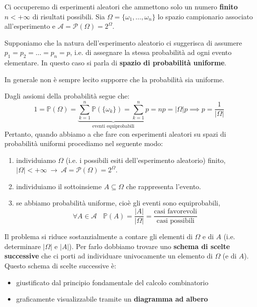 
\ParteEsercizi

Ci occuperemo di esperimenti aleatori che ammettono solo un numero \textbf{finito} $n< +\infty $ di risultati possibili. Sia $\Omega =\{\omega _{1} ,\dotsc ,\omega _{n}\}$ lo spazio campionario associato all'esperimento e $\mathcal{A} =\mathcal{P}( \Omega ) =2^{\Omega }$.

Supponiamo che la natura dell'esperimento aleatorio ci suggerisca di assumere $p_{1} =p_{2} =\dotsc =p_{n} =p$, i.e. di assegnare la stessa probabilità ad ogni evento elementare. In questo caso si parla di \textbf{spazio di probabilità uniforme}.
\begin{oss}
In generale non è sempre lecito supporre che la probabilità sia uniforme.
\end{oss}
Dagli assiomi della probabilità segue che:
\begin{equation*}
1=\mathbb{P}( \Omega ) =\underbrace{\sum\limits _{k=1}^{n}\mathbb{P}(\{\omega _{k}\}) =\sum\limits _{k=1}^{n} p}_{\text{eventi equiprobabili}} =np=| \Omega | p\implies \boxed{p=\frac{1}{| \Omega | }}
\end{equation*}
Pertanto, quando abbiamo a che fare con esperimenti aleatori su spazi di probabilità uniformi procediamo nel seguente modo:
\begin{enumerate}
\item individuiamo $\Omega $ (i.e. i possibili esiti dell'esperimento aleatorio) finito, $| \Omega | < +\infty \ \rightarrow \ \mathcal{A} =\mathcal{P}( \Omega ) =2^{\Omega }$.
\item individuiamo il sottoinsieme $A\subseteq \Omega $ che rappresenta l'evento.
\item se abbiamo probabilità uniforme, cioè gli eventi sono equiprobabili,\begin{equation*}
\boxed{\forall A\in \mathcal{A} \ \ \ \ \mathbb{P}( A) =\frac{| A| }{| \Omega | } =\frac{\text{casi favorevoli}}{\text{casi possibili}}}
\end{equation*}
\end{enumerate}

Il problema si riduce sostanzialmente a contare gli elementi di $\Omega $ e di $A$ (i.e. determinare $| \Omega | $ e $| A| $). Per farlo dobbiamo trovare uno \textbf{schema di scelte successive} che ci porti ad individuare univocamente un elemento di $\Omega $ (e di $A$). Questo schema di scelte successive è:
\begin{itemize}
\item giustificato dal principio fondamentale del calcolo combinatorio
\item graficamente visualizzabile tramite un \textbf{diagramma ad albero}
\end{itemize}

